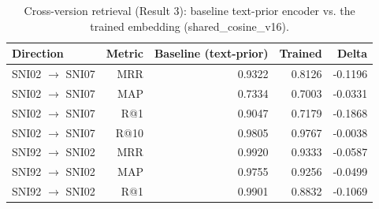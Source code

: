 \begin{table}[t]
\centering
\begin{tabular}{lrrrr}
\toprule
Direction & Metric & Baseline (text-prior) & Trained & Delta \\
\midrule
SNI02 $\rightarrow$ SNI07 & MRR & 0.9322 & 0.8126 & -0.1196 \\
SNI02 $\rightarrow$ SNI07 & MAP & 0.7334 & 0.7003 & -0.0331 \\
SNI02 $\rightarrow$ SNI07 & R@1 & 0.9047 & 0.7179 & -0.1868 \\
SNI02 $\rightarrow$ SNI07 & R@10 & 0.9805 & 0.9767 & -0.0038 \\
SNI92 $\rightarrow$ SNI02 & MRR & 0.9920 & 0.9333 & -0.0587 \\
SNI92 $\rightarrow$ SNI02 & MAP & 0.9755 & 0.9256 & -0.0499 \\
SNI92 $\rightarrow$ SNI02 & R@1 & 0.9901 & 0.8832 & -0.1069 \\
\bottomrule
\end{tabular}
\caption{Cross-version retrieval (Result 3): baseline text-prior encoder vs. the trained embedding (shared\_cosine\_v16).}
\label{tab:retrieval-table}
\end{table}
